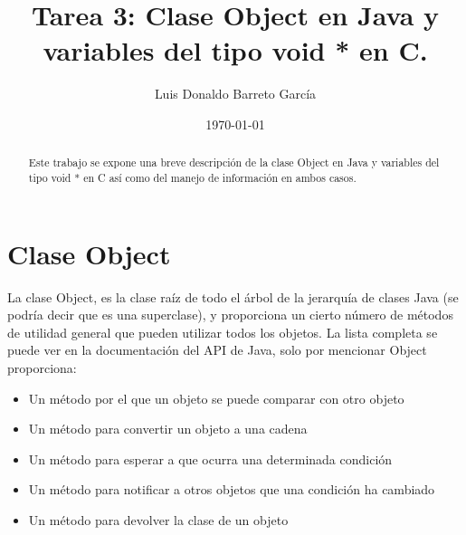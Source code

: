 \documentclass[12pt ]{article}
\author{Luis Donaldo Barreto Garc\'ia}
\date{\today}
\title{Tarea 3: Clase Object en Java y variables del tipo void * en C.}
\begin{document}
	\maketitle
\begin{abstract}
	Este trabajo se expone una breve descripción de la clase Object en Java y variables del tipo void * en C así como del manejo de información en ambos casos.
\end{abstract}
\section{Clase Object}

La clase Object, es la clase raíz de todo el árbol de la jerarquía de clases Java (se podría decir que es una superclase), y proporciona un cierto número de métodos de utilidad general que pueden utilizar todos los objetos. La lista completa se puede ver en la documentación del API de Java, solo por mencionar Object proporciona:
\begin{itemize}
	\item Un método por el que un objeto se puede comparar con otro objeto
	\item Un método para convertir un objeto a una cadena
	 \item Un método para esperar a que ocurra una determinada condición
	\item Un método para notificar a otros objetos que una condición ha cambiado
	\item Un método para devolver la clase de un objeto
\end{itemize}
\end{document}

